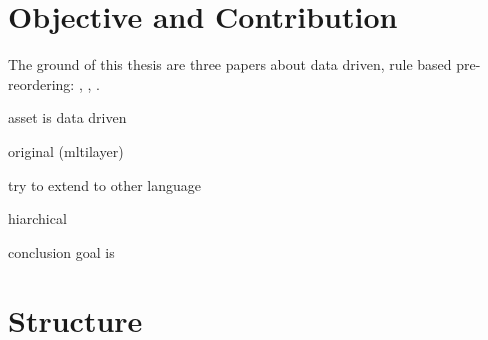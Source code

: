 \section{Objective and Contribution}
\label{ch:Introduction:sec:ObjectiveAndContribution}
The ground of this thesis are three papers about data driven, rule based pre-reordering: \cite{short}, \cite{long}, \cite{tree}.

asset is data driven

original (mltilayer)

try to extend to other language

hiarchical

conclusion goal is



\section{Structure}
\label{ch:Introduction:sec:Structure}
